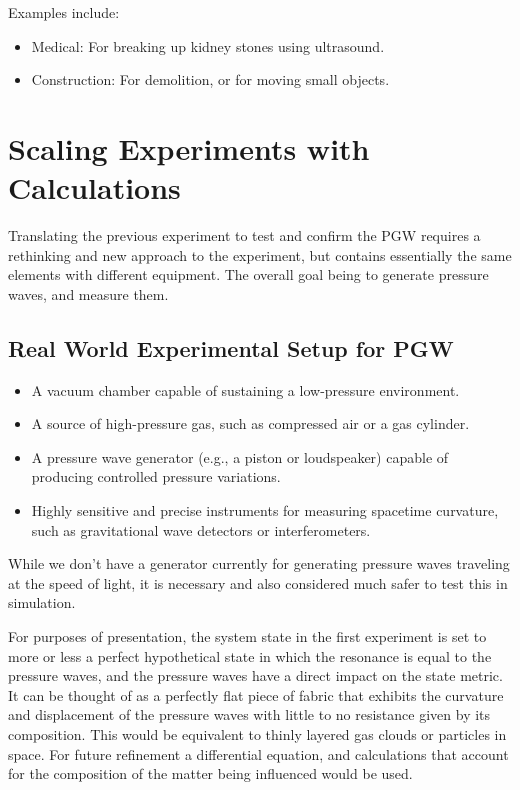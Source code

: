 \documentclass[12pt]{article}
\begin{document}
Examples include:

\begin{itemize}
    \item Medical: For breaking up kidney stones using ultrasound.
    \item Construction: For demolition, or for moving small objects.
\end{itemize}

\section*{Scaling Experiments with Calculations}

Translating the previous experiment to test and confirm the PGW requires a rethinking and new approach to the experiment, but contains essentially the same elements with different equipment. The overall goal being to generate pressure waves, and measure them.

\subsection*{Real World Experimental Setup for PGW}

\begin{itemize}
    \item A vacuum chamber capable of sustaining a low-pressure environment.
    \item A source of high-pressure gas, such as compressed air or a gas cylinder.
    \item A pressure wave generator (e.g., a piston or loudspeaker) capable of producing controlled pressure variations.
    \item Highly sensitive and precise instruments for measuring spacetime curvature, such as gravitational wave detectors or interferometers.
\end{itemize}

While we don’t have a generator currently for generating pressure waves traveling at the speed of light, it is necessary and also considered much safer to test this in simulation.

For purposes of presentation, the system state in the first experiment is set to more or less a perfect hypothetical state in which the resonance is equal to the pressure waves, and the pressure waves have a direct impact on the state metric. It can be thought of as a perfectly flat piece of fabric that exhibits the curvature and displacement of the pressure waves with little to no resistance given by its composition. This would be equivalent to thinly layered gas clouds or particles in space. For future refinement a differential equation, and calculations that account for the composition of the matter being influenced would be used.
\end{document}
